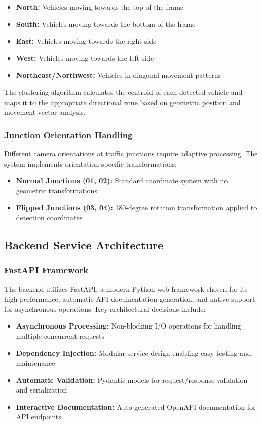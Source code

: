 \documentclass[conference]{IEEEtran}
\begin{document}
\begin{itemize}
\item \textbf{North:} Vehicles moving towards the top of the frame
\item \textbf{South:} Vehicles moving towards the bottom of the frame
\item \textbf{East:} Vehicles moving towards the right side
\item \textbf{West:} Vehicles moving towards the left side
\item \textbf{Northeast/Northwest:} Vehicles in diagonal movement patterns
\end{itemize}

The clustering algorithm calculates the centroid of each detected vehicle and maps it to the appropriate directional zone based on geometric position and movement vector analysis.

\subsubsection{Junction Orientation Handling}

Different camera orientations at traffic junctions require adaptive processing. The system implements orientation-specific transformations:

\begin{itemize}
\item \textbf{Normal Junctions (01, 02):} Standard coordinate system with no geometric transformations
\item \textbf{Flipped Junctions (03, 04):} 180-degree rotation transformation applied to detection coordinates
\end{itemize}

\subsection{Backend Service Architecture}

\subsubsection{FastAPI Framework}

The backend utilizes FastAPI, a modern Python web framework chosen for its high performance, automatic API documentation generation, and native support for asynchronous operations. Key architectural decisions include:

\begin{itemize}
\item \textbf{Asynchronous Processing:} Non-blocking I/O operations for handling multiple concurrent requests
\item \textbf{Dependency Injection:} Modular service design enabling easy testing and maintenance
\item \textbf{Automatic Validation:} Pydantic models for request/response validation and serialization
\item \textbf{Interactive Documentation:} Auto-generated OpenAPI documentation for API endpoints
\end{itemize}
\end{document}
